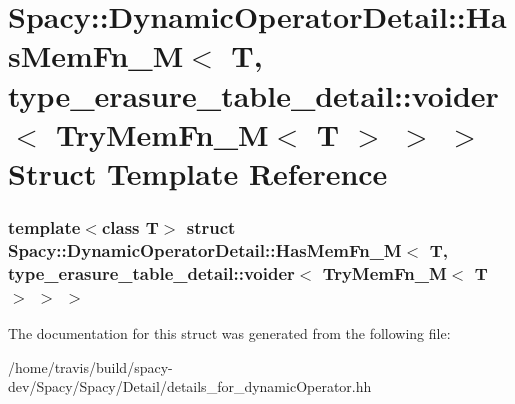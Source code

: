 \hypertarget{structSpacy_1_1DynamicOperatorDetail_1_1HasMemFn__M_3_01T_00_01type__erasure__table__detail_1_1v75755858ab1a6423be7a98330f3c9546}{\section{\-Spacy\-:\-:\-Dynamic\-Operator\-Detail\-:\-:\-Has\-Mem\-Fn\-\_\-\-M$<$ \-T, type\-\_\-erasure\-\_\-table\-\_\-detail\-:\-:voider$<$ \-Try\-Mem\-Fn\-\_\-\-M$<$ \-T $>$ $>$ $>$ \-Struct \-Template \-Reference}
\label{structSpacy_1_1DynamicOperatorDetail_1_1HasMemFn__M_3_01T_00_01type__erasure__table__detail_1_1v75755858ab1a6423be7a98330f3c9546}
}
\subsubsection*{template$<$class T$>$ struct Spacy\-::\-Dynamic\-Operator\-Detail\-::\-Has\-Mem\-Fn\-\_\-\-M$<$ T, type\-\_\-erasure\-\_\-table\-\_\-detail\-::voider$<$ Try\-Mem\-Fn\-\_\-\-M$<$ T $>$ $>$ $>$}



\-The documentation for this struct was generated from the following file\-:\begin{DoxyCompactItemize}
\item 
/home/travis/build/spacy-\/dev/\-Spacy/\-Spacy/\-Detail/details\-\_\-for\-\_\-dynamic\-Operator.\-hh\end{DoxyCompactItemize}
